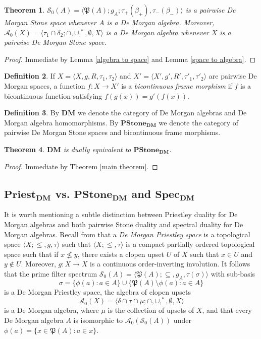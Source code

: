 \documentclass{amsart}
\theoremstyle{plain}
\newtheorem{theorem}{Theorem}[section]
\theoremstyle{definition}
\newtheorem{definition}[theorem]{Definition}
\begin{document}
\begin{theorem}
    $\mathcal{S}_0(A)=\langle\mathfrak{P}(A);g_A;\tau_+(\beta_+),\tau_-(\beta_-)\rangle$ is a pairwise De Morgan Stone space whenever $A$ is a De Morgan algebra. Moreover, $\mathcal{A}_0(X)=\langle\tau_1\cap\delta_2;\cap,\cup,^*,\emptyset,X\rangle$ is a De Morgan algebra whenever $X$ is a pairwise De Morgan Stone space. 
\end{theorem}
\begin{proof}
    Immediate by Lemma \ref{algebra to space} and Lemma \ref{space to algebra}. 
\end{proof}
\begin{definition}
    If $X = \langle X, g, R, \tau_1, \tau_2 \rangle$ and $X' = \langle X', g', R', \tau'_1, \tau'_2 \rangle$ are pairwise De Morgan spaces, a function $f\colon X\to X'$ is a \emph{bicontinuous frame morphism} if $f$ is a bicontinuous function satisfying $f(g(x))=g'(f(x))$. 
  
\end{definition}
\begin{definition}
    By $\mathbf{DM}$ we denote the category of De Morgan algebras and De Morgan algebra homomorphisms. By $\mathbf{PStone_{DM}}$ we denote the category of pairwise De Morgan Stone spaces and bicontinuous frame morphisms. 
\end{definition}
\begin{theorem}
    $\mathbf{DM}$ is dually equivalent to $\mathbf{PStone_{DM}}$. 
\end{theorem}
\begin{proof}
    Immediate by Theorem \ref{main theorem}.  
\end{proof}

\subsection{$\mathbf{Priest_{DM}}$ vs. $\mathbf{PStone_{DM}}$ and $\mathbf{Spec_{DM}}$} It is worth mentioning a subtle distinction between Priestley duality for De Morgan algebras and both pairwise Stone duality and spectral duality for De Morgan algebras. Recall from \cite{cornish1} that a \emph{De Morgan Priestley space} is a topological space $\langle X;\leq,g,\tau\rangle$ such that $\langle X;\leq,\tau\rangle$ is a compact partially ordered topological space such that if $x\not\leq y$, there exists a clopen upset $U$ of $X$ such that $x\in U$ and $y\not\in U$. Moreover, $g\colon X\to X$ is a continuous order-inverting involution. It follows that the prime filter spectrum $\mathcal{S}_0(A)=\langle\mathfrak{P}(A);\subseteq,g_A,\tau(\sigma)\rangle$ with sub-basis 
$$\sigma = \{\phi(a):a\in A\}\cup \{\mathfrak{P}(A)\setminus\phi(a) : a \in A\}$$
is a De Morgan Priestley space, the algebra of clopen upsets $$\mathcal{A}_0(X)=\langle\delta\cap\tau\cap\mu;\cap,\cup,^*,\emptyset,X\rangle$$ is a De Morgan algebra, where $\mu$ is the collection of upsets of $X$, and that every De Morgan algebra $A$ is isomorphic to $\mathcal{A}_0(\mathcal{S}_0(A))$ under $\phi(a)=\{x\in\mathfrak{P}(A):a\in x\}$. 
\end{document}
